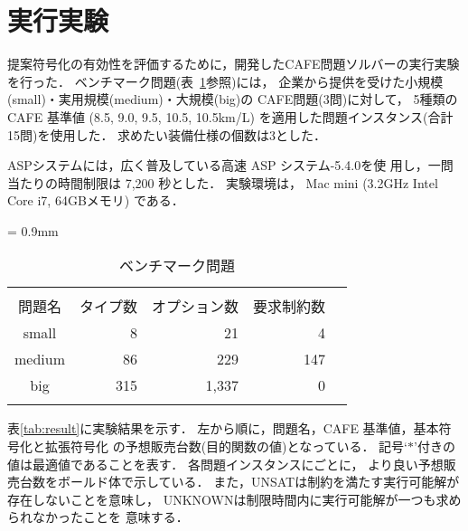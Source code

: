 \section{実行実験}





提案符号化の有効性を評価するために，開発したCAFE問題ソルバーの実行実験
を行った．
ベンチマーク問題(表~\ref{tab:bench}参照)には，
企業から提供を受けた小規模(small)・実用規模(medium)・大規模(big)の
CAFE問題(3問)に対して，
5種類の CAFE 基準値 (8.5, 9.0, 9.5, 10.5, 10.5km/L)
を適用した問題インスタンス(合計15問)を使用した．
求めたい装備仕様の個数は3とした．

ASPシステムには，広く普及している高速 ASP システム{\clingo}-5.4.0を使
用し，一問当たりの時間制限は 7,200 秒とした．
実験環境は，
Mac mini (3.2GHz Intel Core i7, 64GBメモリ)
である．

\begin{table}[tb]
  \caption{ベンチマーク問題}
  \centering
  \tabcolsep = 0.9mm
  \begin{tabular}{crrrr}
    & & & \\\bhline
    問題名 & タイプ数	& オプション数	& 要求制約数 	\\\hline
    small	    & 8		& 21	& 4	  	        \\
    medium    & 86	& 229	& 147	  	        \\
    big	    & 315	& 1,337	& 0	          	\\\hline
    & & & \\
  \end{tabular}
 \label{tab:bench}
\end{table}

表\ref{tab:result}に実験結果を示す．
左から順に，問題名，CAFE 基準値，基本符号化と拡張符号化
の予想販売台数(目的関数の値)となっている．
記号`$\ast$'付きの値は最適値であることを表す．
各問題インスタンスにごとに，
より良い予想販売台数をボールド体で示している．
また，\textsf{UNSAT}は制約を満たす実行可能解が存在しないことを意味し，
\textsf{UNKNOWN}は制限時間内に実行可能解が一つも求められなかったことを
意味する．

